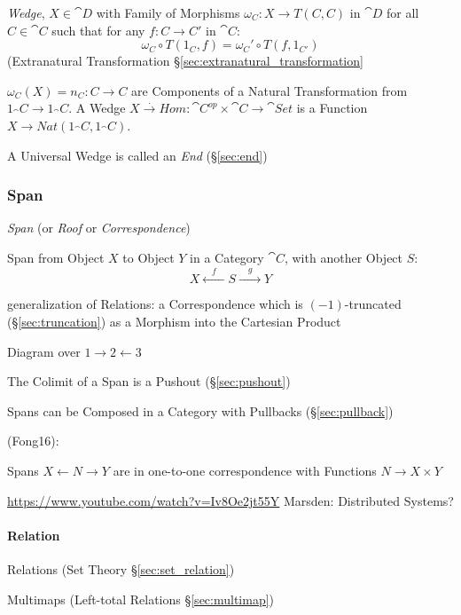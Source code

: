 \emph{Wedge}, $X \in \cat{D}$ with Family of Morphisms $\omega_C :
X \rightarrow T(C,C)$ in $\cat{D}$ for all $C \in \cat{C}$ such
that for any $f : C \rightarrow C'$ in $\cat{C}$:
\[
  \omega_C \circ T(1_C,f) = \omega_C' \circ T(f,1_{C'})
\]
(Extranatural Transformation \S\ref{sec:extranatural_transformation}

$\omega_C(X) = n_C : C \rightarrow C$ are Components of a Natural
Transformation from $1_\cat{C} \rightarrow 1_\cat{C}$. A Wedge
$X \xrightarrow{.} Hom : \cat{C}^{op} \times \cat{C} \rightarrow
\cat{Set}$ is a Function $X \rightarrow Nat
(1_\cat{C},1_\cat{C})$.

A Universal Wedge is called an \emph{End} (\S\ref{sec:end})



\subsubsection{Span}\label{sec:span}

\emph{Span} (or \emph{Roof} or \emph{Correspondence})

Span from Object $X$ to Object $Y$ in a Category $\cat{C}$, with
another Object $S$:
\[
  X \xleftarrow{\quad f \quad} S \xrightarrow{\quad g \quad} Y
\]

generalization of Relations: a Correspondence which is
$(-1)$-truncated (\S\ref{sec:truncation}) as a Morphism into the
Cartesian Product

Diagram over $1 \rightarrow 2 \leftarrow 3$

The Colimit of a Span is a Pushout (\S\ref{sec:pushout})

Spans can be Composed in a Category with Pullbacks
(\S\ref{sec:pullback})

(Fong16):

Spans $X \leftarrow N \rightarrow Y$ are in one-to-one correspondence
with Functions $N \rightarrow X \times Y$

\url{https://www.youtube.com/watch?v=Iv8Oe2jt55Y} Marsden: Distributed
Systems? %



\paragraph{Relation}\label{sec:relation}\hfill

\fist Relations (Set Theory \S\ref{sec:set_relation})

\fist Multimaps (Left-total Relations \S\ref{sec:multimap})

